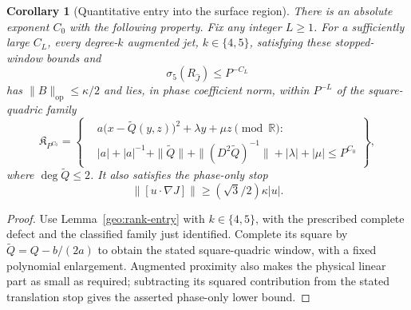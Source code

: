 \documentclass[11pt]{amsart}
\newtheorem{corollary}[theorem]{Corollary}
\theoremstyle{definition}
\theoremstyle{remark}
\numberwithin{equation}{section}
\begin{document}
\begin{corollary}[Quantitative entry into the surface region]\label{geo:rank-four-entry-low}
There is an absolute exponent $C_0$ with the following property. Fix any integer $L\ge1$. For a sufficiently large $C_L$, every degree-$k$ augmented jet, $k\in\{4,5\}$, satisfying these stopped-window bounds and
\[
\sigma_5(R_{\widehat J})\le P^{-C_L}
\]
has $\|B\|_{\mathrm{op}}\le\kappa/2$ and lies, in phase coefficient norm, within $P^{-L}$ of the square-quadric family
\begin{equation}\label{low:4:rc:surface-family}
\mathfrak K_{P^{C_0}}=\left\{\begin{aligned}
&a\bigl(x-\widetilde Q(y,z)\bigr)^2+\lambda y+\mu z\pmod{\mathbb R}:\\
&|a|+|a|^{-1}+\|\widetilde Q\|+\|(D^2\widetilde Q)^{-1}\|+|\lambda|+|\mu|\le P^{C_0}
\end{aligned}\right\},
\end{equation}
where $\deg\widetilde Q\le2$. It also satisfies the phase-only stop
\[
\|[u\cdot\nabla J]\|\ge(\sqrt3/2)\kappa |u|.
\]

\end{corollary}
\begin{proof}
Use Lemma~\ref{geo:rank-entry} with $k\in\{4,5\}$, with the prescribed complete defect and the classified family just identified. Complete its square by $\widetilde Q=Q-b/(2a)$ to obtain the stated square-quadric window, with a fixed polynomial enlargement. Augmented proximity also makes the physical linear part as small as required; subtracting its squared contribution from the stated translation stop gives the asserted phase-only lower bound.
\end{proof}
\end{document}
